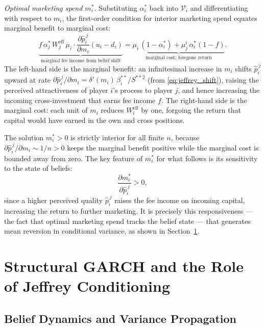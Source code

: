 \documentclass[12pt,a4paper]{article}
\newcommand{\hatpij}{\hat{p}_i^{\,j}}
\newcommand{\1}{\mathbf{1}}
\begin{document}
\textit{Optimal marketing spend $m_i^*$.}
Substituting $\alpha_i^*$ back into $\mathcal{V}_i$ and
differentiating with respect to $m_i$, the first-order condition
for interior marketing spend equates marginal benefit to marginal
cost:
\begin{equation}
  \underbrace{f\,\alpha_j^*\,W_j^{\mathrm{eff}}\,\mu_i
              \cdot
              \frac{\partial\hatpij}{\partial m_i}
              (u_i - d_i)}_{\text{marginal fee income from belief shift}}
  =
  \underbrace{\mu_i\,(1 - \alpha_i^*)
              + \mu_j^i\,\alpha_i^*(1-f)}_{\text{marginal cost: foregone return}}.
  \label{eq:foc_marketing}
\end{equation}
The left-hand side is the marginal benefit: an infinitesimal
increase in $m_i$ shifts $\hatpij$ upward at rate
$\partial\hatpij/\partial m_i = \delta'(m_i)\,\beta_i^{**}/S^{**2}$
(from \eqref{eq:jeffrey_shift}), raising the perceived
attractiveness of player $i$'s process to player $j$, and
hence increasing the incoming cross-investment that earns
fee income $f$. The right-hand side is the marginal cost:
each unit of $m_i$ reduces $W_i^{\mathrm{eff}}$ by one,
forgoing the return that capital would have earned in the
own and cross positions.

The solution $m_i^* > 0$ is strictly interior for all finite
$n$, because $\partial\hatpij/\partial m_i \sim 1/n > 0$
keeps the marginal benefit positive while the marginal cost
is bounded away from zero. The key feature of $m_i^*$ for
what follows is its sensitivity to the state of beliefs:
\begin{equation}
  \frac{\partial m_i^*}{\partial \hatpij} > 0,
  \label{eq:dm_dphat}
\end{equation}
since a higher perceived quality $\hatpij$ raises the fee
income on incoming capital, increasing the return to further
marketing. It is precisely this responsiveness --- the fact
that optimal marketing spend tracks the belief state ---
that generates mean reversion in conditional variance, as
shown in Section~\ref{sec:garch}.

\section{Structural GARCH and the Role of Jeffrey Conditioning}
\label{sec:garch}

\subsection{Belief Dynamics and Variance Propagation}
\end{document}
